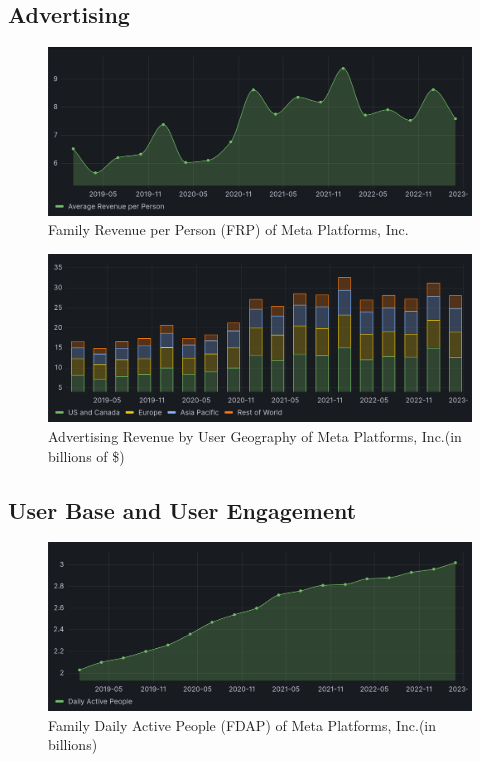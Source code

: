 \documentclass[12pt, a4paper]{article}
\begin{document}
\subsection*{Advertising}

\begin{figure}[H]
    \centering
    \includegraphics[width=1.00\textwidth]{family-revenue-per-person}
    \caption{Family Revenue per Person (FRP) of Meta Platforms,
    Inc.\cite{2023q1,2021q2Slides,2019q4Slides}}
    \label{fig:family-revenue-per-person}
\end{figure}

\begin{figure}[H]
    \centering
    \includegraphics[width=1.00\textwidth]{advertising-revenue-by-user-geography}
    \caption{Advertising Revenue by User Geography of Meta Platforms, Inc.(in
    billions of \$)\cite{2023q1,2021q2Slides,2019q4Slides}}
    \label{fig:advertising-revenue-by-user-geography}
\end{figure}


\subsection*{User Base and User Engagement}

\begin{figure}[H]
    \centering
    \includegraphics[width=1.00\textwidth]{family-dap}
    \caption{Family Daily Active People (FDAP) of Meta Platforms, Inc.(in
    billions)\cite{2023q1,2021q2Slides,2019q4Slides}}
    \label{fig:family-dap}
\end{figure}
\end{document}
